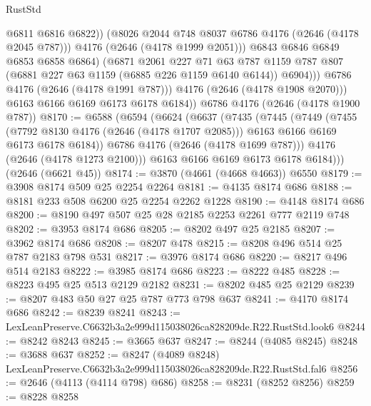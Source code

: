 \begin{lexlean}{RustStd}
\begin{coremodule}
                        @6811
                        @6816
                        @6822))
                    (@8026 @2044 @748 @8037 @6786 @4176 (@2646 (@4178 @2045 @787)))
                    @4176
                    (@2646 (@4178 @1999 @2051)))
                  @6843
                  @6846
                  @6849
                  @6853
                  @6858
                  @6864)
                (@6871
                  @2061
                  @227
                  @71
                  @63
                  @787
                  @1159
                  @787
                  @807
                  (@6881 @227 @63 @1159 (@6885 @226 @1159 @6140 @6144))
                  @6904)))
            @6786
            @4176
            (@2646 (@4178 @1991 @787)))
          @4176
          (@2646 (@4178 @1908 @2070)))
        @6163
        @6166
        @6169
        @6173
        @6178
        @6184))
    @6786
    @4176
    (@2646 (@4178 @1900 @787))
@8170 := @6588
    (@6594
      (@6624
        (@6637
          (@7435
            (@7445
              (@7449
                (@7455
                  (@7792 @8130 @4176 (@2646 (@4178 @1707 @2085)))
                  @6163
                  @6166
                  @6169
                  @6173
                  @6178
                  @6184))
              @6786
              @4176
              (@2646 (@4178 @1699 @787)))
            @4176
            (@2646 (@4178 @1273 @2100)))
          @6163
          @6166
          @6169
          @6173
          @6178
          @6184)))
    (@2646 (@6621 @45))
@8174 := @3870 (@4661 (@4668 @4663)) @6550
@8179 := @3908 @8174 @509 @25 @2254 @2264
@8181 := @4135 @8174 @686
@8188 := @8181 @233 @508 @6200 @25 @2254 @2262 @1228
@8190 := @4148 @8174 @686
@8200 := @8190 @497 @507 @25 @28 @2185 @2253 @2261 @777 @2119 @748
@8202 := @3953 @8174 @686
@8205 := @8202 @497 @25 @2185
@8207 := @3962 @8174 @686
@8208 := @8207 @478
@8215 := @8208 @496 @514 @25 @787 @2183 @798 @531
@8217 := @3976 @8174 @686
@8220 := @8217 @496 @514 @2183
@8222 := @3985 @8174 @686
@8223 := @8222 @485
@8228 := @8223 @495 @25 @513 @2129 @2182
@8231 := @8202 @485 @25 @2129
@8239 := @8207 @483 @50 @27 @25 @787 @773 @798 @637
@8241 := @4170 @8174 @686
@8242 := @8239 @8241
@8243 := LexLeanPreserve.C6632b3a2e999d115038026ca828209de.R22.RustStd.look6
@8244 := @8242 @8243
@8245 := @3665 @637
@8247 := @8244 (@4085 @8245)
@8248 := @3688 @637
@8252 := @8247 (@4089 @8248) LexLeanPreserve.C6632b3a2e999d115038026ca828209de.R22.RustStd.fal6
@8256 := @2646 (@4113 (@4114 @798) @686)
@8258 := @8231 (@8252 @8256)
@8259 := @8228 @8258

\end{coremodule}
\end{lexlean}
